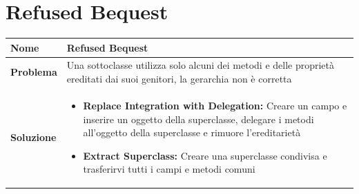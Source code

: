 \section{Refused Bequest}
\begin{table}[h]
    \centering
    \renewcommand{\arraystretch}{1.2} %
    \begin{tabularx}{\textwidth}{l X}
        \toprule
        \textbf{Nome} & Refused Bequest \\
        \midrule
        \textbf{Problema} & Una sottoclasse utilizza solo alcuni dei metodi e delle proprietà ereditati dai suoi genitori, la gerarchia non è corretta \\
        \midrule
        \textbf{Soluzione} & 
        \begin{itemize}[leftmargin=*, nosep, after=\vspace{0.5em}]
            \item \textbf{Replace Integration with Delegation:} Creare un campo e inserire un oggetto della superclasse, delegare i metodi all'oggetto della superclasse e rimuore l'ereditarietà
            \item \textbf{Extract Superclass:} Creare una superclasse condivisa e trasferirvi tutti i campi e metodi comuni
        \end{itemize}
        \\ %
        \bottomrule
    \end{tabularx}
\end{table}